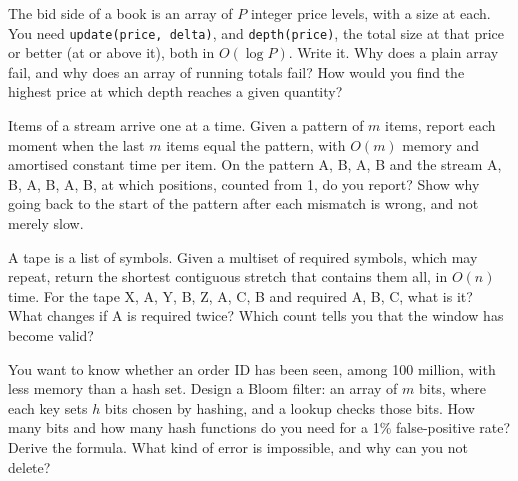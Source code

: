 \begin{question}\label{iq:iv3:algorithms:59}
The bid side of a book is an array of $P$ integer price levels, with a size at each. You need \texttt{update(price, delta)}, and \texttt{depth(price)}, the total size at that price or better (at or above it), both in $O(\log P)$. Write it. Why does a plain array fail, and why does an array of running totals fail? How would you find the highest price at which depth reaches a given quantity?
\end{question}

\begin{question}\label{iq:iv3:algorithms:60}
Items of a stream arrive one at a time. Given a pattern of $m$ items, report each moment when the last $m$ items equal the pattern, with $O(m)$ memory and amortised constant time per item. On the pattern A, B, A, B and the stream A, B, A, B, A, B, at which positions, counted from 1, do you report? Show why going back to the start of the pattern after each mismatch is wrong, and not merely slow.
\end{question}

\begin{question}\label{iq:iv3:algorithms:61}
A tape is a list of symbols. Given a multiset of required symbols, which may repeat, return the shortest contiguous stretch that contains them all, in $O(n)$ time. For the tape X, A, Y, B, Z, A, C, B and required A, B, C, what is it? What changes if A is required twice? Which count tells you that the window has become valid?
\end{question}

\begin{question}\label{iq:iv3:algorithms:62}
You want to know whether an order ID has been seen, among 100 million, with less memory than a hash set. Design a Bloom filter: an array of $m$ bits, where each key sets $h$ bits chosen by hashing, and a lookup checks those bits. How many bits and how many hash functions do you need for a 1\% false-positive rate? Derive the formula. What kind of error is impossible, and why can you not delete?
\end{question}

